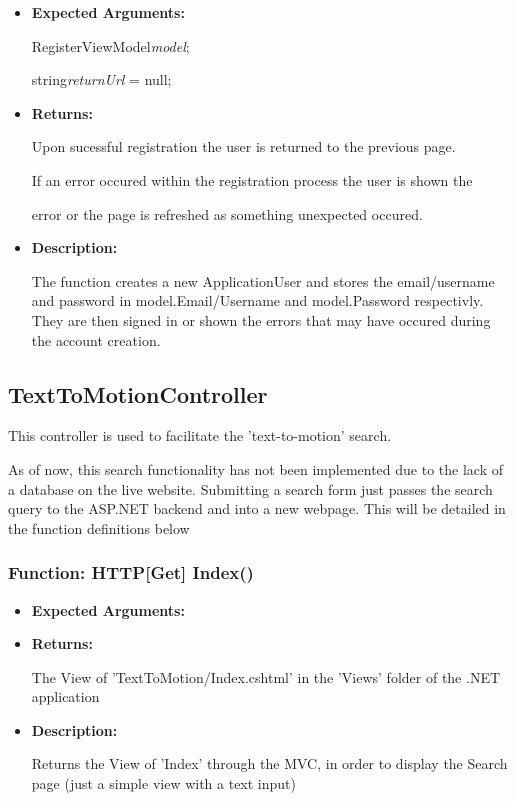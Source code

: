 \documentclass{scrreprt}
\begin{document}
\begin{itemize}
        \item \textbf{Expected Arguments:}

                RegisterViewModel\quad\textit{model};

                string\quad\textit{returnUrl} = null;

        \item \textbf{Returns:}

                Upon sucessful registration the user is returned to the
                previous page.

                If an error occured within the registration process the user is
                shown the

                error or the page is refreshed as something unexpected occured.

        \item \textbf{Description:}

                The function creates a new ApplicationUser and stores the
                email/username and password in model.Email/Username and
                model.Password respectivly. They are then signed in or shown
                the errors that may have occured during the account creation.
\end{itemize}


\subsection{TextToMotionController}

This controller is used to facilitate the 'text-to-motion' search.

As of now, this search functionality has not been implemented due to the lack
of a database on the live website. Submitting a search form just passes the
search query to the ASP.NET backend and into a new webpage. This will be
detailed in the function definitions below

\subsubsection{Function: HTTP[Get] Index()}

\begin{itemize}
        \item \textbf{Expected Arguments:}
        \item \textbf{Returns:}

                The View of 'TextToMotion/Index.cshtml' in the 'Views' folder
                of the .NET application

        \item \textbf{Description:}

                Returns the View of 'Index' through the MVC, in order to
                display the Search page (just a simple view with a text input)
\end{itemize}
\end{document}
